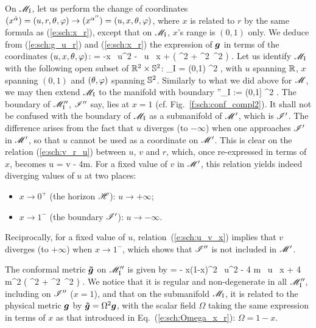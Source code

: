On $\mathscr{M}_{\rm I}$, let us perform the change of coordinates
$(x^{\check{\alpha}}) = (u,r,\theta,\varphi) \rightarrow (x^{\alpha''}) = (u,x,\theta,\varphi)$,
where $x$ is related to $r$ by the same formula as (\ref{e:sch:x_r}),
except that on $\mathscr{M}_{\rm I}$, $x$'s range is $(0,1)$ only.
We deduce from (\ref{e:sch:g_u_r}) and (\ref{e:sch:x_r})
the expression of $\bm{g}$ in terms of the coordinates $(u,x,\theta,\varphi)$:
\be
         = -x \, \dd u^2
            - \, \dd u \, \dd x
        +   \left( \dd\th^2 + \sin^2\th\, \dd\ph^2 \right) .
\ee
Let us identify $\mathscr{M}_{\rm I}$ with the following open subset of
$\mathbb{R}^2\times \mathbb{S}^2$:
\be
    \M_{\rm I} = \R \times (0,1) \times \SS^2 ,
\ee
with $u$ spanning $\mathbb{R}$, $x$ spanning $(0,1)$ and $(\theta,\varphi)$
spanning $\mathbb{S}^2$. Similarly to what we did above for $\mathscr{M}$, we may then
extend $\mathscr{M}_{\rm I}$ to the manifold with boundary
\be
    \M''_{\rm I} :=  \R \times (0,1] \times \SS^2 .
\ee
The boundary of $\mathscr{M}''_{\rm I}$, $\mathscr{I}''$ say, lies at $x=1$
(cf. Fig.~\ref{f:sch:conf_compl2}). It shall not be
confused with the boundary of $\mathscr{M}_{\rm I}$ as a submanifold of $\mathscr{M}'$, which is
$\mathscr{I}'$. The difference arises from the fact that $u$ diverges (to $-\infty$)
when one approaches $\mathscr{I}'$ in $\mathscr{M}'$, so that $u$ cannot be used as a
coordinate on $\mathscr{M}'$. This is clear on the relation (\ref{e:sch:v_r_u})
between $u$, $v$ and $r$, which, once re-expressed in terms of $x$, becomes
\be \label{e:sch:u_v_x}
    u = v - 4m.
\ee
For a fixed value of $v$ in $\mathscr{M}'$, this relation yields indeed diverging values of
$u$ at two places:
\begin{itemize}
\item $x\rightarrow 0^+$ (the horizon $\mathscr{H}$): $u\rightarrow +\infty$;
\item $x\rightarrow 1^-$ (the boundary $\mathscr{I}'$): $u\rightarrow -\infty$.
\end{itemize}
Reciprocally, for a fixed value of $u$, relation~(\ref{e:sch:u_v_x})
implies that $v$ diverges (to $+\infty$) when $x\rightarrow 1^-$, which shows that
$\mathscr{I}''$ is not included in $\mathscr{M}'$.

The conformal metric $\bm{\tilde{g}}$ on $\mathscr{M}''_{\rm I}$ is given by
\be \label{e:sch:tilde_g_x_u}
      =
            - x(1-x)^2 \, \dd u^2
            - 4 m \, \dd u \, \dd x
        + 4 m^2 \left( \dd\th^2 + \sin^2\th\, \dd\ph^2 \right) .
\ee
We notice that it is regular and non-degenerate in all $\mathscr{M}''_{\rm I}$,
including on $\mathscr{I}''$ ($x=1$), and that on the submanifold $\mathscr{M}_{\rm I}$, it is related to the physical metric $\bm{g}$ by $\bm{\tilde{g}} = \Omega^2 \bm{g}$, with the
scalar field $\Omega$ taking the same expression in terms of $x$ as
that introduced in Eq.~(\ref{e:sch:Omega_x_r}): $\Omega=1-x$.


